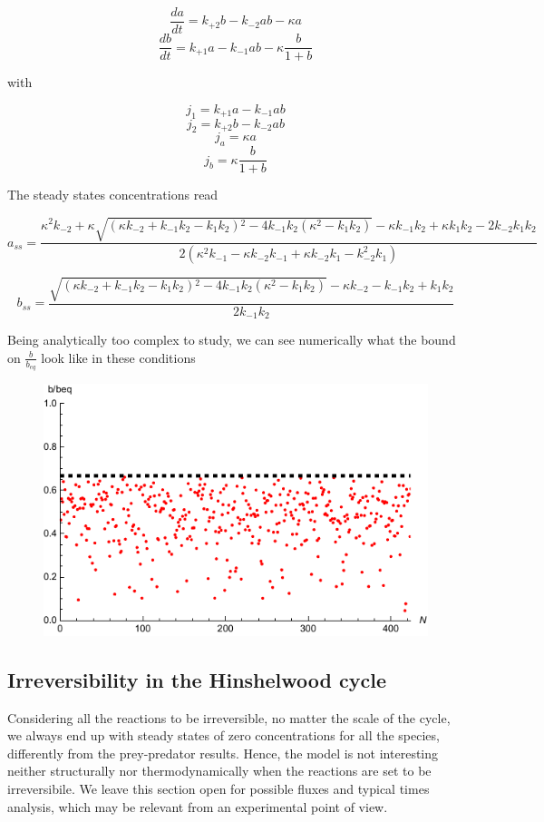 \documentclass{article}
\begin{document}
	\begin{equation}
		\frac{da}{dt}=k_{+2}b -k_{-2}ab - \kappa a
	\end{equation}
	\begin{equation}
		\frac{db}{dt}=k_{+1}a -k_{-1}ab - \kappa \frac{b}{1+b}
	\end{equation}
	
	with 
	
	\begin{equation}
		j_1=k_{+1}a -k_{-1}ab 
	\end{equation}
	\begin{equation}
		j_2=k_{+2}b -k_{-2}ab
	\end{equation}
	\begin{equation}
		j_a=\kappa a
	\end{equation}
	\begin{equation}
		j_b=\kappa \frac{b}{1+b} 
	\end{equation}
	
	The steady states concentrations read
	
	$$a_{ss}=\frac{\kappa ^2 k_{-2}+\kappa  \sqrt{\left(\kappa  k_{-2}+k_{-1} k_2-k_1 k_2\right){}^2-4 k_{-1} k_2 \left(\kappa ^2-k_1 k_2\right)}-\kappa  k_{-1} k_2+\kappa  k_1 k_2-2 k_{-2} k_1 k_2}{2 \left(\kappa ^2 k_{-1}-\kappa  k_{-2} k_{-1}+\kappa  k_{-2} k_1-k_{-2}^2 k_1\right)}$$
	
	$$b_{ss}=\frac{\sqrt{\left(\kappa  k_{-2}+k_{-1} k_2-k_1 k_2\right){}^2-4 k_{-1} k_2 \left(\kappa ^2-k_1 k_2\right)}-\kappa  k_{-2}-k_{-1} k_2+k_1 k_2}{2 k_{-1} k_2}$$
	
	Being analytically too complex to study, we can see numerically what the bound on $\frac{b}{b_{eq}}$ look like in these conditions
	
	
	\begin{figure}[h!]
		\centering
		\includegraphics[width=0.45\linewidth]{MM.pdf}
	\end{figure}
	
	
	\subsection{Irreversibility in the Hinshelwood cycle}
	Considering all the reactions to be irreversible, no matter the scale of the cycle, we always end up with steady states of zero concentrations for all the species, differently from the prey-predator results. Hence, the model is not interesting neither structurally nor thermodynamically when the reactions are set to be irreversibile. We leave this section open for possible fluxes and typical times analysis, which may be relevant from an experimental point of view.
	
\end{document}
